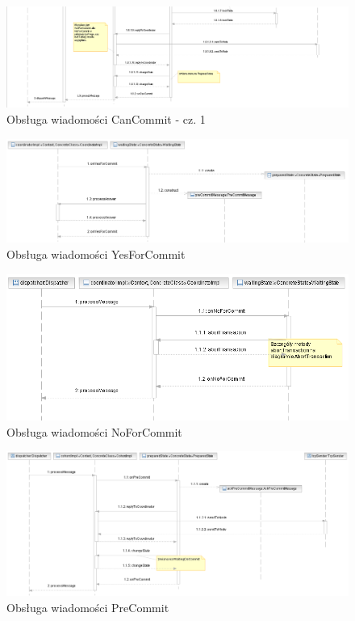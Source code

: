 \documentclass[a4paper, oneside, 11pt]{report}
\begin{document}
\begin{figure}[h]
\centering
\includegraphics[width=22cm,angle=90]{sekwencje/CanCommitMessage2.png}
\caption{Obsługa wiadomości CanCommit - cz. 1}
\end{figure}

\begin{figure}[h]
\centering
\includegraphics[width=22cm,angle=90]{sekwencje/YesForCommit.png}
\caption{Obsługa wiadomości YesForCommit}
\end{figure}

\begin{figure}[h]
\centering
\includegraphics[width=22cm,angle=90]{sekwencje/NoForCommit.png}
\caption{Obsługa wiadomości NoForCommit}
\end{figure}

\begin{figure}[h]
\centering
\includegraphics[width=22cm,angle=90]{sekwencje/PreCommitMessage.png}
\caption{Obsługa wiadomości PreCommit}
\end{figure}
\end{document}
